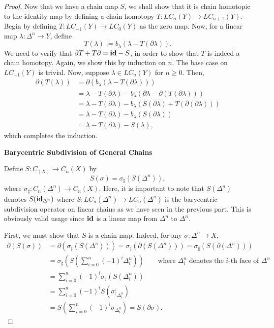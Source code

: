 \begin{proof}
Now that we have a chain map $S$, we shall show that it is chain homotopic to the identity map by defining a chain homotopy $T: LC_n(Y)\to LC_{n + 1}(Y)$. Begin by defining $T: LC_{-1}(Y)\to LC_0(Y)$ as the zero map. Now, for a linear map $\lambda:\Delta^n\to Y$, define
\begin{equation*}
    T(\lambda) := b_\lambda(\lambda - T(\partial\lambda)).
\end{equation*}
We need to verify that $\partial T + T\partial = \mathbf{id} -S$, in order to show that $T$ is indeed a chain homotopy. Again, we show this by induction on $n$. The base case on $LC_{-1}(Y)$ is trivial. Now, suppose $\lambda\in LC_n(Y)$ for $n\ge 0$. Then, 
\begin{align*}
    \partial(T(\lambda)) &= \partial(b_\lambda(\lambda - T(\partial\lambda)))\\
    &= \lambda - T(\partial\lambda) - b_\lambda(\partial\lambda - \partial(T(\partial\lambda)))\\
    &= \lambda - T(\partial\lambda) - b_\lambda\left(S(\partial\lambda) + T(\partial(\partial\lambda))\right)\\
    &= \lambda - T(\partial\lambda) - b_\lambda(S(\partial\lambda))\\
    &= \lambda - T(\partial\lambda) - S(\lambda),
\end{align*}
which completes the induction.

\noindent\textbf{Barycentric Subdivision of General Chains}

Define $S: C_(X)\to C_n(X)$ by 
\begin{equation*}
    S(\sigma) = \sigma_\sharp(S(\Delta^n)),
\end{equation*}
where $\sigma_\sharp: C_n(\Delta^n)\to C_n(X)$. Here, it is important to note that $S(\Delta^n)$ denotes $S(\mathbf{id}_{\Delta^n})$ where $S: LC_n(\Delta^n)\to LC_n(\Delta^n)$ is the barycentric subdivision operator on linear chains as we have seen in the previous part. This is obviously valid usage since $\mathbf{id}$ is a linear map from $\Delta^n$ to $\Delta^n$.

First, we must show that $S$ is a chain map. Indeed, for any $\sigma:\Delta^n\to X$, 
\begin{align*}
    \partial(S(\sigma)) &= \partial(\sigma_\sharp(S(\Delta^n))) = \sigma_\sharp(\partial(S(\Delta^n))) = \sigma_\sharp(S(\partial(\Delta^n)))\\
    &= \sigma_\sharp\left(S\left(\sum_{i = 0}^n(-1)^i\Delta^n_i\right)\right)\qquad\text{where $\Delta^n_i$ denotes the $i$-th face of $\Delta^n$}\\
    &= \sum_{i = 0}^n (-1)^i\sigma_\sharp(S(\Delta^n_i))\\
    &= \sum_{i = 0}^n (-1)^i S(\sigma|_{\Delta^n_i})\\
    &= S\left(\sum_{i = 0}^n (-1)^i\sigma_{\Delta^n_i}\right) = S(\partial\sigma).
\end{align*}


\end{proof}
